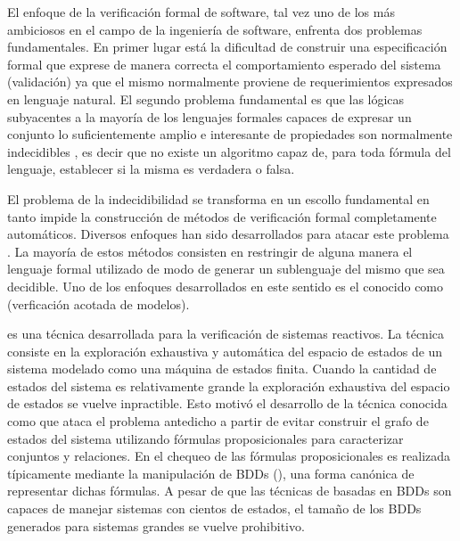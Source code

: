 El enfoque de la verificación formal de software, tal vez uno de los más
ambiciosos en el campo de la ingeniería de software, enfrenta dos problemas
fundamentales. En primer lugar está la dificultad de construir una
especificación formal que exprese de manera correcta el comportamiento esperado
del sistema (validación) ya que el mismo normalmente proviene de requerimientos
expresados en lenguaje natural. El segundo problema fundamental es que las
lógicas subyacentes a la mayoría de los lenguajes formales capaces de expresar
un conjunto lo suficientemente amplio e interesante de propiedades son
normalmente indecidibles , es decir que no existe un
algoritmo capaz de, para toda fórmula del lenguaje, establecer si la misma es
verdadera o falsa.

El problema de la indecidibilidad se transforma en un escollo fundamental en
tanto impide la construcción de métodos de verificación formal completamente
automáticos. Diversos enfoques han sido desarrollados para atacar este problema
. La mayoría  de estos métodos
consisten en restringir de alguna manera el lenguaje formal utilizado de modo de
generar un sublenguaje del mismo que sea decidible. Uno de los enfoques
desarrollados en este sentido es el conocido como \bmc
(verficación acotada de modelos).

\mc\cite{emerson:scp-2_3} es una técnica desarrollada para la verificación de
sistemas reactivos. La técnica consiste en la exploración exhaustiva y
automática del espacio de estados de un sistema modelado como una máquina de
estados finita. Cuando la cantidad de estados del sistema es relativamente
grande la exploración exhaustiva del espacio de estados se vuelve inpractible.
Esto motivó el desarrollo de la técnica conocida como \smc\cite{burch:lics90,
mcmillan93} que ataca el problema antedicho a partir de evitar construir el
grafo de estados del sistema utilizando fórmulas proposicionales para
caracterizar conjuntos y relaciones. En \smc el chequeo de las fórmulas
proposicionales es realizada típicamente mediante la manipulación de BDDs
(\bdds), una forma canónica de representar dichas fórmulas. A pesar de que las
técnicas de \smc basadas en  BDDs son capaces de manejar sistemas con cientos de
estados, el tamaño de los BDDs generados para sistemas grandes se vuelve
prohibitivo. 

